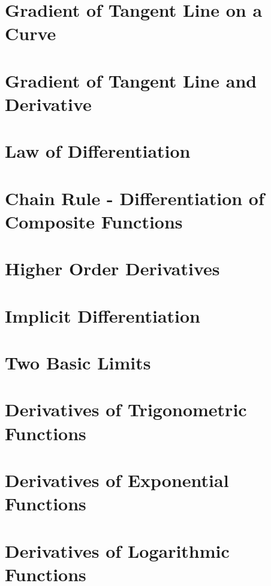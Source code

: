 \documentclass[12pt]{report}
\begin{document}
\section{Gradient of Tangent Line on a Curve}

\section{Gradient of Tangent Line and Derivative}

\section{Law of Differentiation}

\section{Chain Rule - Differentiation of Composite Functions}

\section{Higher Order Derivatives}

\section{Implicit Differentiation}

\section{Two Basic Limits}

\section{Derivatives of Trigonometric Functions}

\section{Derivatives of Exponential Functions}

\section{Derivatives of Logarithmic Functions}
\end{document}

